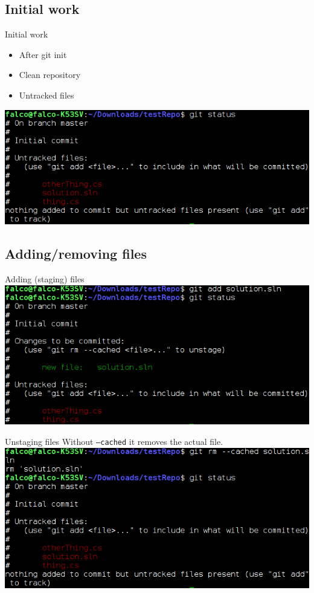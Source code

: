 \documentclass[10pt,a4paper]{beamer}
\begin{document}
\subsection{Initial work}
\begin{frame}{Initial work}
\begin{itemize}
\item After git init
\item Clean repository
\item Untracked files
\end{itemize}

\includegraphics[width=\linewidth]{gitStatus1.png}
\end{frame}

\subsection{Adding/removing files}
\begin{frame}{Adding (staging) files}
\includegraphics[width=\linewidth]{gitAdd.png}
\end{frame}

\begin{frame}{Unstaging files}
Without \texttt{--cached} it removes the actual file.
\includegraphics[width=\linewidth]{gitrmcached.png}
\end{frame}
\end{document}

